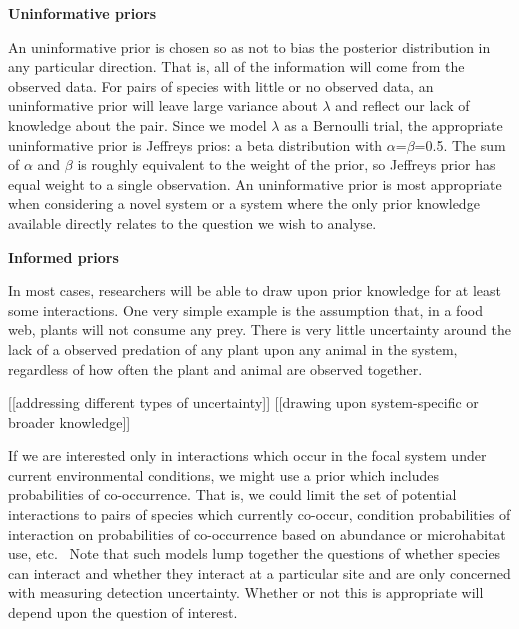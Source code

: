 \documentclass[12pt]{article}
\begin{document}
\begin{spacing}{2.0}
      \textbf{Uninformative priors}

        An uninformative prior is chosen so as not to bias the posterior distribution in any particular direction. That is, all of the information will come from the observed data. For pairs of species with little or no observed data, an uninformative prior will leave large variance about $\lambda$ and reflect our lack of knowledge about the pair. Since we model $\lambda$ as a Bernoulli trial, the appropriate uninformative prior is Jeffreys prios: a beta distribution with $\alpha$=$\beta$=0.5. The sum of $\alpha$ and $\beta$ is roughly equivalent to the weight of the prior, so Jeffreys prior has equal weight to a single observation. An uninformative prior is most appropriate when considering a novel system or a system where the only prior knowledge available directly relates to the question we wish to analyse.


      \textbf{Informed priors}

        In most cases, researchers will be able to draw upon prior knowledge for at least some interactions. One very simple example is the assumption that, in a food web, plants will not consume any prey. There is very little uncertainty around the lack of a observed predation of any plant upon any animal in the system, regardless of how often the plant and animal are observed together. 

        [[addressing different types of uncertainty]]
        [[drawing upon system-specific or broader knowledge]]

        If we are interested only in interactions which occur in the focal system under current environmental conditions, we might use a prior which includes probabilities of co-occurrence. That is, we could limit the set of potential interactions to pairs of species which currently co-occur, condition probabilities of interaction on probabilities of co-occurrence based on abundance or microhabitat use, etc.~\citep{Gravel2013,Weinstein2017} Note that such models lump together the questions of whether species can interact and whether they interact at a particular site and are only concerned with measuring detection uncertainty. Whether or not this is appropriate will depend upon the question of interest.



\end{spacing}
\end{document}
